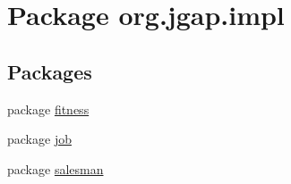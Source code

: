 \hypertarget{namespaceorg_1_1jgap_1_1impl}{\section{Package org.\-jgap.\-impl}
\label{namespaceorg_1_1jgap_1_1impl}
}
\subsection*{Packages}
\begin{DoxyCompactItemize}
\item 
package \hyperlink{namespaceorg_1_1jgap_1_1impl_1_1fitness}{fitness}
\item 
package \hyperlink{namespaceorg_1_1jgap_1_1impl_1_1job}{job}
\item 
package \hyperlink{namespaceorg_1_1jgap_1_1impl_1_1salesman}{salesman}
\end{DoxyCompactItemize}
